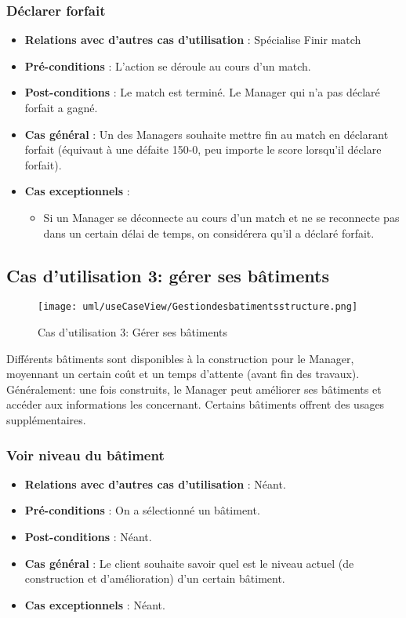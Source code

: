 \documentclass[a4paper,titlepage]{scrreprt}
\begin{document}
    \subsubsection{Déclarer forfait}
      \begin{itemize}
        \item \textbf{Relations avec d'autres cas d'utilisation}  : Spécialise Finir match
        \item \textbf{Pré-conditions} : L'action se déroule au cours d'un match.
        \item \textbf{Post-conditions} : Le match est terminé. Le Manager qui n'a pas déclaré forfait a gagné.
        \item \textbf{Cas général} : Un des Managers souhaite mettre fin au match en déclarant forfait (équivaut à une défaite 150-0, peu importe le score lorsqu’il déclare forfait).
        \item \textbf{Cas exceptionnels} :
          \begin{itemize}
            \item Si un Manager se déconnecte au cours d’un match et ne se reconnecte pas dans un certain délai de temps, on considérera qu’il a déclaré forfait.
          \end{itemize}
      \end{itemize}


  \subsection{Cas d'utilisation 3: gérer ses bâtiments}
    \begin{figure}[H]
    \center
    \texttt{[image: uml/useCaseView/Gestiondesbatimentsstructure.png]}
    \caption{Cas d'utilisation 3: Gérer ses bâtiments}
  \end{figure}	
  Différents bâtiments sont disponibles à la construction pour le Manager, 
  moyennant un certain coût et un temps d'attente (avant fin des travaux). 
  Généralement: une fois construits, le Manager peut améliorer ses bâtiments 
  et accéder aux informations les concernant. Certains bâtiments offrent 
  des usages supplémentaires.
    \subsubsection{Voir niveau du bâtiment}
      \begin{itemize}
        \item \textbf{Relations avec d'autres cas d'utilisation}  : Néant.
        \item \textbf{Pré-conditions} : On a sélectionné un bâtiment.
        \item \textbf{Post-conditions} : Néant.
        \item \textbf{Cas général} : Le client souhaite savoir quel est le niveau actuel (de construction et d'amélioration) d’un certain bâtiment. 
        \item \textbf{Cas exceptionnels} : Néant.
      \end{itemize}
\end{document}
